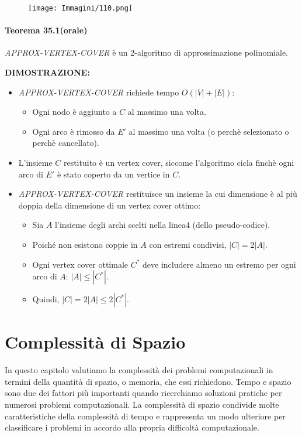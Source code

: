 \documentclass{article}
\begin{document}
\begin{figure}[H]
    \centering
    \texttt{[image: Immagini/110.png]}
    \label{fig:algo-migliorato}
\end{figure}

\paragraph{Teorema 35.1(orale)}
\label{teorema-35.1}
\vspace{1em}
\text{}
\newline
\textit{APPROX-VERTEX-COVER} è un 2-algoritmo di approssimazione polinomiale.

\text{}
\newline
\textbf{DIMOSTRAZIONE:}
\begin{itemize}
    \item \textit{APPROX-VERTEX-COVER} richiede tempo $O(|V| + |E|)$:
    \begin{itemize}
        \item Ogni nodo è aggiunto a $C$ al massimo una volta.
        \item Ogni arco è rimosso da $E'$ al massimo una volta (o perchè selezionato o perchè cancellato).
    \end{itemize}
    \item L’insieme $C$ restituito è un vertex cover, siccome l'algoritmo cicla finchè ogni arco di $E'$ è stato coperto da un vertice in $C$.
    \item \textit{APPROX-VERTEX-COVER} restituisce un insieme la cui dimensione è al più doppia della dimensione di un vertex cover ottimo:
    \begin{itemize}
        \item Sia $A$ l’insieme degli archi scelti nella linea4 (dello pseudo-codice).
        \item Poiché non esistono coppie in $A$ con estremi condivisi, $|C| = 2|A|$.
        \item Ogni vertex cover ottimale $C^*$ deve includere almeno un estremo per ogni arco di $A$: $|A| \leq |C^*|$.
        \item Quindi, $|C| = 2|A| \leq 2|C^*|$.
    \end{itemize}
\end{itemize}

\section{Complessità di Spazio}
In questo capitolo valutiamo la complessità dei problemi computazionali in termini della quantità di spazio, o memoria, che essi richiedono.
Tempo e spazio sono due dei fattori più importanti quando ricerchiamo soluzioni pratiche per numerosi problemi computazionali.
La complessità di spazio condivide molte caratteristiche della complessità di tempo e rappresenta un modo ulteriore per classificare i problemi in accordo alla propria difficoltà computazionale.
\end{document}
